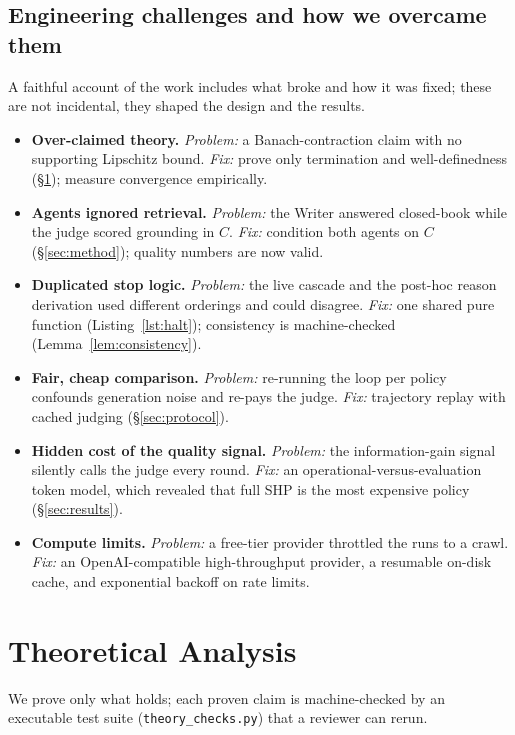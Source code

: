 \documentclass[conference]{IEEEtran}
\begin{document}
\subsection{Engineering challenges and how we overcame them}\label{sec:challenges}
A faithful account of the work includes what broke and how it was fixed; these are
not incidental, they shaped the design and the results.
\begin{itemize}[leftmargin=1.2em,itemsep=2pt,topsep=2pt]
\item \textbf{Over-claimed theory.} \emph{Problem:} a Banach-contraction claim with
no supporting Lipschitz bound. \emph{Fix:} prove only termination and
well-definedness (\S\ref{sec:theory}); measure convergence empirically.
\item \textbf{Agents ignored retrieval.} \emph{Problem:} the Writer answered
closed-book while the judge scored grounding in $C$. \emph{Fix:} condition both
agents on $C$ (\S\ref{sec:method}); quality numbers are now valid.
\item \textbf{Duplicated stop logic.} \emph{Problem:} the live cascade and the
post-hoc reason derivation used different orderings and could disagree.
\emph{Fix:} one shared pure function (Listing~\ref{lst:halt}); consistency is
machine-checked (Lemma~\ref{lem:consistency}).
\item \textbf{Fair, cheap comparison.} \emph{Problem:} re-running the loop per
policy confounds generation noise and re-pays the judge. \emph{Fix:} trajectory
replay with cached judging (\S\ref{sec:protocol}).
\item \textbf{Hidden cost of the quality signal.} \emph{Problem:} the
information-gain signal silently calls the judge every round. \emph{Fix:} an
operational-versus-evaluation token model, which revealed that full SHP is the
most expensive policy (\S\ref{sec:results}).
\item \textbf{Compute limits.} \emph{Problem:} a free-tier provider throttled the
runs to a crawl. \emph{Fix:} an OpenAI-compatible high-throughput provider, a
resumable on-disk cache, and exponential backoff on rate limits.
\end{itemize}

\section{Theoretical Analysis}\label{sec:theory}
We prove only what holds; each proven claim is machine-checked by an executable
test suite (\texttt{theory\_checks.py}) that a reviewer can rerun.
\end{document}
